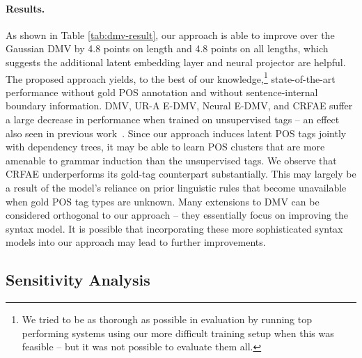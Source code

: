 \documentclass[11pt,a4paper]{article}
\begin{document}
\paragraph{Results.}
As shown in Table \ref{tab:dmv-result}, our approach is able to improve over the Gaussian DMV by 4.8 points on length  and 4.8 points on all lengths, which suggests the additional latent embedding layer and neural projector are helpful. The proposed approach yields, to the best of our knowledge,\footnote{We tried to be as thorough as possible in evaluation by running top performing systems using our more difficult training setup when this was feasible -- but it was not possible to evaluate them all.} state-of-the-art performance without gold POS annotation and without sentence-internal boundary information. DMV, UR-A E-DMV, Neural E-DMV, and CRFAE suffer a large decrease in performance when trained on unsupervised tags -- an effect also seen in previous work~\citep{spitkovsky2011unsupervised, cohen2011unsupervised}. Since our approach induces latent POS tags jointly with dependency trees, it may be able to learn POS clusters that are more amenable to grammar induction than the unsupervised tags. We observe that CRFAE underperforms its gold-tag counterpart substantially. This may largely be a result of the model's reliance on prior linguistic rules that become unavailable when gold POS tag types are unknown. 
Many extensions to DMV can be considered orthogonal to our approach -- they essentially focus on improving the syntax model.
It is possible that incorporating these more sophisticated syntax models into our approach may lead to further improvements. 


\subsection{Sensitivity Analysis}
\end{document}
